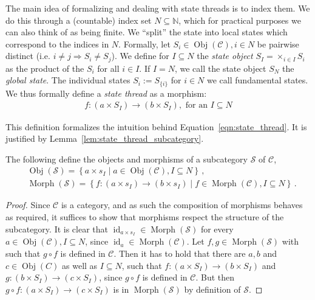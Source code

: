 The main idea of formalizing and dealing with state threads is to index them.
We do this through a (countable) index set $N \subseteq \mathbb{N}$, which for practical purposes we can also think of as being finite.
We ``split'' the state into local states which correspond to the indices in $N$. Formally, let $S_i \in \operatorname{Obj}(\mathcal{C}), i \in N$ be pairwise distinct (i.e. $i \neq j \Rightarrow S_i \neq S_j$).
We define for $I \subseteq N$ the \emph{state object} $S_I = \times_{i \in I} S_i$ as the product of the $S_i$ for all $i \in I$. If $I = N$, we call the state object $S_N$ the \emph{global state}.
The individual states $S_i := S_{\{i\}}$ for $i \in N$ we call fundamental states. We thus formally define a \emph{state thread} as a morphism:
\begin{align*}
  f : (a \times S_I) \rightarrow (b \times S_I), \text{ for an } I \subseteq N
\end{align*}

This definition formalizes the intuition behind Equation~\ref{eqn:state_thread}. 
It is justified by Lemma~\ref{lem:state_thread_subcategory}.

\begin{lem}
\label{lem:state_thread_subcategory}
The following define the objects and morphisms of a subcategory $\mathcal{S}$ of $\mathcal{C}$,
\begin{align}
	& \operatorname{Obj}({\mathcal{S}}) = \left\{ a\times s_I \mid
		a\in\operatorname{Obj}({\mathcal{C}}),
	 	I\subseteq N \right\} \,, \\
	& \operatorname{Morph}({\mathcal{S}}) = \left\{ f : (a\times s_I) \rightarrow (b\times s_I) \mid
		f\in\operatorname{Morph}({\mathcal{C}}),
		I\subseteq N \right\} \,.
\end{align}%
\begin{proof}
Since $\mathcal{C}$ is a category, and as such the composition of morphisms behaves as required, it suffices to show that morphisms respect the structure of the subcategory.
It is clear that $\operatorname{id}_{a\times s_I} \in \operatorname{Morph}(\mathcal{S})$ for every $a \in \operatorname{Obj}(\mathcal{C}), I \subseteq N$, since $\operatorname{id}_a \in \operatorname{Morph}(\mathcal{C})$.
Let $f,g \in \operatorname{Morph}(\mathcal{S})$ with such that $g \circ f$ is defined in $\mathcal{C}$.
Then it has to hold that there are $a,b$ and $c \in \operatorname{Obj}(C)$ as well as $I \subseteq N$, such that $f : (a \times S_I) \rightarrow (b \times S_I)$ and $g : (b \times S_I) \rightarrow (c \times S_I)$,
since $g \circ f$ is defined in $\mathcal{C}$. But then $g \circ f : (a \times S_I) \rightarrow (c \times S_I)$ is in $\operatorname{Morph}(\mathcal{S})$ by definition of $\mathcal{S}$.
\end{proof}
\end{lem}%

